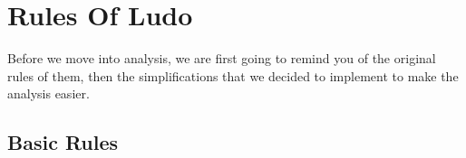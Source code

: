 \documentclass{article} %
\begin{document}
\section{Rules Of Ludo}
    Before we move into analysis, we are first going to remind you of the original rules of them, then the simplifications that we decided to implement to make the analysis easier. 
    \subsection{Basic Rules}
\end{document}
